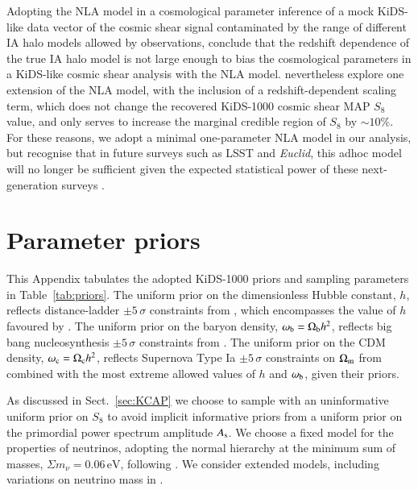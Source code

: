 \begin{appendix}
{Adopting the NLA model in a cosmological parameter inference of a mock KiDS-like data vector of the cosmic shear signal contaminated by the range of different IA halo models allowed by observations, \citet{fortuna/etal:2020} conclude that the redshift dependence of the true IA halo model is not large enough to bias the cosmological parameters in a KiDS-like cosmic shear analysis with the NLA model.   \citet{asgari/etal:2020} nevertheless explore one extension of the NLA model, with the inclusion of a redshift-dependent scaling term, which does not change the recovered KiDS-1000 cosmic shear MAP $S_8$ value, and only serves to increase the marginal credible region of $S_8$ by $\sim 10\%$.   For these reasons, we adopt a minimal one-parameter NLA model in our \tttp analysis, but recognise that in future surveys such as LSST and {\it Euclid}, this adhoc model will no longer be sufficient given the expected statistical power of these next-generation surveys \citep{blazek/etal:2019, fortuna/etal:2020}.

}

\section{Parameter priors}
\label{app:priors}
This Appendix tabulates the adopted KiDS-1000 priors and sampling parameters in Table~\ref{tab:priors}.   
The uniform prior on the dimensionless Hubble constant, $h$, reflects distance-ladder $\pm 5\,\sigma$ constraints from \citet{riess/etal:2016}, which encompasses the value of $h$ favoured by \citet{planck/etal:2018}.  
The uniform prior on the baryon density, $\omega_{\rm b}= \Omega_{\rm b}h^2$, reflects big bang nucleosynthesis $\pm 5\, \sigma$ constraints from \citet{olive/etal:2014}.   
The uniform prior on the CDM density, $\omega_{\rm c} = \Omega_{\rm c}h^2$, reflects Supernova Type Ia $\pm 5\, \sigma$ constraints on $\Omega_{\rm m}$ from \citet{scolnic/etal:2018} combined with the most extreme allowed values of $h$ and $\omega_{\rm b}$, given their priors.   

As discussed in Sect.~\ref{sec:KCAP} we choose to sample with an uninformative uniform prior on $S_8$ to avoid implicit informative priors from a uniform prior on the primordial power spectrum amplitude $A_{\rm s}$.    
We choose a fixed model for the properties of neutrinos, adopting the normal hierarchy at the minimum sum of masses, $\Sigma m_\nu = 0.06\,\mathrm{eV}$, following \citet{planck/etal:2018}.  
We consider extended models, including variations on neutrino mass in \citet{troester/etal:inprep}.


\end{appendix}
